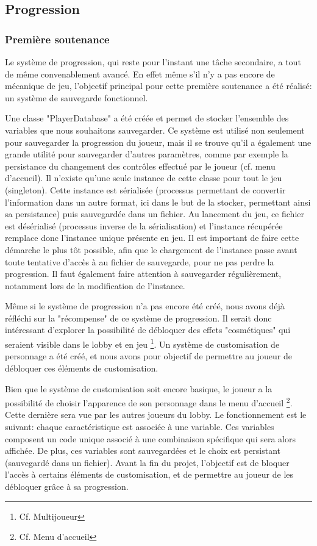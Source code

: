 \subsection{Progression}

	\subsubsection{Première soutenance}


	Le système de progression, qui reste pour l'instant une tâche secondaire, a tout de même convenablement avancé. En effet même s'il n'y a pas 
    encore de mécanique de jeu, l'objectif principal pour cette première soutenance a été réalisé: un système de sauvegarde fonctionnel.

    Une classe "PlayerDatabase" a été créée et permet de stocker l'ensemble des variables que nous souhaitons sauvegarder. Ce système est utilisé non seulement 
	pour sauvegarder la progression du joueur, mais il se trouve qu'il a également une grande 
    utilité pour sauvegarder d'autres paramètres, comme par exemple la persistance du changement des contrôles effectué par le joueur (cf. menu d'accueil). 
    Il n'existe qu'une seule instance de cette classe pour tout le jeu (singleton). Cette instance est sérialisée (processus permettant de convertir 
    l'information dans un autre format, ici dans le but de la stocker, permettant ainsi sa persistance) puis sauvegardée dans un fichier. Au lancement du 
    jeu, ce fichier est désérialisé (processus inverse de la sérialisation) et l'instance récupérée remplace donc l'instance unique présente en jeu. Il est 
    important de faire cette démarche le plus tôt possible, afin que le chargement de l'instance passe avant toute tentative d'accès à au fichier de sauvegarde, pour ne pas perdre la progression. 
    Il faut également faire attention à sauvegarder régulièrement, notamment lors de la modification de l'instance.

    Même si le système de progression n'a pas encore été créé, nous avons déjà réfléchi sur la "récompense" de ce système de progression. Il serait donc 
    intéressant d'explorer la possibilité de débloquer des effets "cosmétiques" qui seraient visible dans le lobby et en jeu \footnote{Cf. Multijoueur}. Un système de 
    customisation de personnage a été créé, et nous avons pour objectif de permettre au joueur de débloquer ces éléments de customisation.

    Bien que le système de customisation soit encore basique, le joueur a la possibilité de choisir l'apparence de son personnage dans le menu d'accueil
    \footnote{Cf. Menu d'accueil}. Cette dernière sera vue par les autres joueurs du lobby. Le fonctionnement est le suivant: chaque caractéristique est associée 
    à une variable. Ces variables composent un code unique associé à une combinaison spécifique qui sera alors affichée. De plus, ces variables sont 
    sauvegardées et le choix est persistant (sauvegardé dans un fichier). Avant la fin du projet, l'objectif est de bloquer l'accès à certains éléments de 
    customisation, et de permettre au joueur de les débloquer grâce à sa progression.


